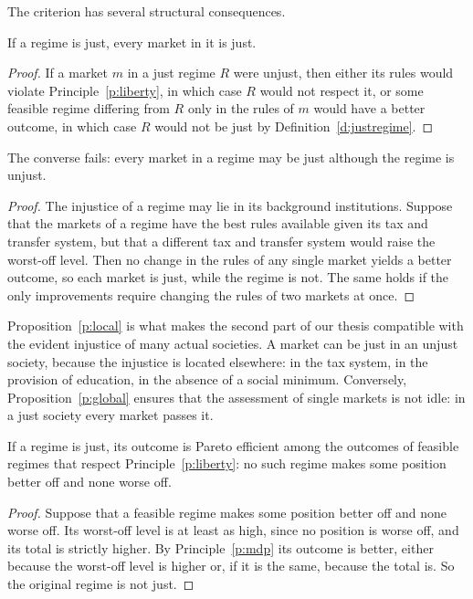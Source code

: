 \documentclass{situationist-preprint}
\begin{document}
The criterion has several structural consequences.

\begin{proposition}\label{p:global}
If a regime is just, every market in it is just.
\end{proposition}

\begin{proof}
If a market $m$ in a just regime $R$ were unjust, then either its rules would violate Principle~\ref{p:liberty}, in which case $R$ would not respect it, or some feasible regime differing from $R$ only in the rules of $m$ would have a better outcome, in which case $R$ would not be just by Definition~\ref{d:justregime}.
\end{proof}

\begin{proposition}\label{p:local}
The converse fails: every market in a regime may be just although the regime is unjust.
\end{proposition}

\begin{proof}
The injustice of a regime may lie in its background institutions. Suppose that the markets of a regime have the best rules available given its tax and transfer system, but that a different tax and transfer system would raise the worst-off level. Then no change in the rules of any single market yields a better outcome, so each market is just, while the regime is not. The same holds if the only improvements require changing the rules of two markets at once.
\end{proof}

Proposition~\ref{p:local} is what makes the second part of our thesis compatible with the evident injustice of many actual societies. A market can be just in an unjust society, because the injustice is located elsewhere: in the tax system, in the provision of education, in the absence of a social minimum. Conversely, Proposition~\ref{p:global} ensures that the assessment of single markets is not idle: in a just society every market passes it.

\begin{proposition}\label{p:pareto}
If a regime is just, its outcome is Pareto efficient among the outcomes of feasible regimes that respect Principle~\ref{p:liberty}: no such regime makes some position better off and none worse off.
\end{proposition}

\begin{proof}
Suppose that a feasible regime makes some position better off and none worse off. Its worst-off level is at least as high, since no position is worse off, and its total is strictly higher. By Principle~\ref{p:mdp} its outcome is better, either because the worst-off level is higher or, if it is the same, because the total is. So the original regime is not just.
\end{proof}
\end{document}
